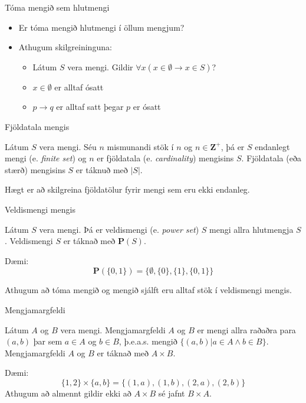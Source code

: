 \documentclass[handout]{beamer}
\begin{document}
\begin{frame}{Tóma mengið sem hlutmengi}
\begin{itemize}
 \item Er tóma mengið hlutmengi í öllum mengjum? \pause
 \item Athugum skilgreininguna:
 \begin{itemize}
  \item Látum $S$ vera mengi. Gildir $\forall x (x \in \emptyset \to x \in S)$? \pause
  \item $x \in \emptyset$ er alltaf ósatt \pause
  \item $p \to q$ er alltaf satt þegar $p$ er ósatt
 \end{itemize}
\end{itemize}
\end{frame}

\begin{frame}{Fjöldatala mengis}
\begin{tcolorbox}[title=Fjöldatala]
Látum $S$ vera mengi. Séu $n$ mismunandi stök í $n$ og $n \in \mathbf{Z^+}$, þá er $S$ endanlegt mengi (e. \emph{finite set}) og $n$ er fjöldatala (e. \emph{cardinality}) mengisins $S$. Fjöldatala (eða stærð) mengisins $S$ er táknuð með $|S|$.
\end{tcolorbox}
Hægt er að skilgreina fjöldatölur fyrir mengi sem eru ekki endanleg.
\end{frame}

\begin{frame}{Veldismengi mengis}
\begin{tcolorbox}[title=Veldismengi]
Látum $S$ vera mengi. Þá er veldismengi (e. \emph{power set}) $S$ mengi allra hlutmengja $S$. Veldismengi $S$ er táknað með $\mathbf{P}(S)$.
\end{tcolorbox}
Dæmi: \[\mathbf{P}(\{0, 1\}) = \{\emptyset, \{0\}, \{1\}, \{0, 1\}\}\]

Athugum að tóma mengið og mengið sjálft eru alltaf stök í veldismengi mengis.
\end{frame}

\begin{frame}{Mengjamargfeldi}
\begin{tcolorbox}[title=Mengjamargfeldi]
Látum $A$ og $B$ vera mengi. Mengjamargfeldi $A$ og $B$ er mengi allra raðaðra para $(a, b)$ þar sem $a \in A$ og $b \in B$, þ.e.a.s. mengið $\{(a, b) | a \in A \land b \in B\}$. Mengjamargfeldi $A$ og $B$ er táknað með $A \times B$.
\end{tcolorbox}
Dæmi:
\[
 \{1, 2\} \times \{a, b\} = \{(1, a), (1, b), (2, a), (2, b)\}
\]
Athugum að almennt gildir ekki að $A \times B$ sé jafnt $B \times A$.
\end{frame}
\end{document}

